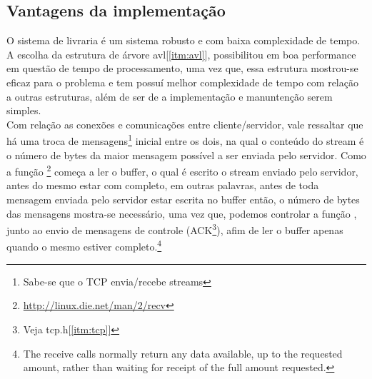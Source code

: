 \documentclass[a4paper,10pt]{article}
\begin{document}
\subsection{Vantagens da implementação}
O sistema de livraria é um sistema robusto e com baixa complexidade de tempo.
A escolha da estrutura de árvore avl[\ref{itm:avl}], possibilitou em boa 
performance em questão de tempo de processamento, uma vez que, essa estrutura
mostrou-se eficaz para o problema e tem possuí melhor complexidade de tempo com 
relação a outras estruturas, além de ser de a implementação e manuntenção serem
simples.
\\ Com relação as conexões e comunicações entre cliente/servidor, vale ressaltar que há uma troca de mensagens\footnote{Sabe-se que o TCP envia/recebe streams} inicial entre os dois, na qual o conteúdo do stream
é o número de bytes da maior mensagem possível a ser enviada pelo servidor.
Como a função \footnote{\url{http://linux.die.net/man/2/recv}} começa a ler o buffer, o qual é escrito o stream enviado pelo servidor, antes do mesmo estar com completo, em outras palavras, antes de toda mensagem enviada pelo servidor estar escrita no buffer então, o número de bytes das mensagens mostra-se necessário, uma vez que, podemos controlar a função , junto ao envio de mensagens de controle (ACK\footnote{Veja tcp.h[\ref{itm:tcp}]}), afim de ler o buffer apenas quando o mesmo estiver completo.\footnote{The receive calls normally return any data available, up to the requested amount, rather than waiting for receipt of the full amount requested.}
\end{document}
